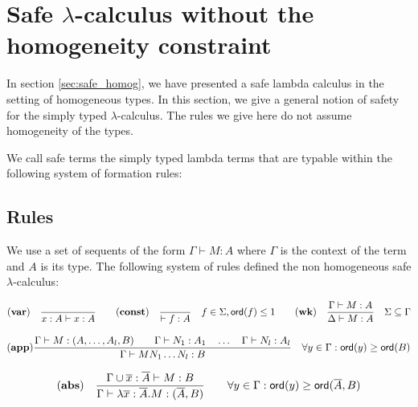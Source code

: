 \clearpage

\section{Safe $\lambda$-calculus without the homogeneity constraint}
\label{sec:safe_nonhomog}


In section \ref{sec:safe_homog}, we have presented a safe lambda
calculus in the setting of homogeneous types. In this section, we
give a general notion of safety for the simply typed
$\lambda$-calculus. The rules we give here do not assume homogeneity
of the types.

We call safe terms the simply typed lambda terms that are
typable within the following system of formation rules:

\subsection{Rules}

We use a set of sequents of the form $\Gamma \vdash M : A$ where $\Gamma$ is the context of the term and $A$ is its type.
The following system of rules defined the non homogeneous safe $\lambda$-calculus:

$$ \mathbf{(var)} \quad  \frac{\displaystyle }{x : A\vdash x : A}
\qquad  \mathbf{(const)} \quad  \frac{\displaystyle }{\vdash f : A} \quad f \in \Sigma, {\sf ord}(f) \leq 1
\qquad  \mathbf{(wk)} \quad  \frac{\displaystyle \Gamma \vdash M : A}{\Delta \vdash M : A} \quad \Sigma \subseteq \Gamma$$

$$ \mathbf{(app)} \frac{\displaystyle \Gamma \vdash M : (A,\ldots,A_l,B)
                                        \qquad \Gamma \vdash N_1 : A_1
                                        \quad \ldots \quad \Gamma \vdash N_l : A_l  }{\Gamma  \vdash M N_1 \ldots N_l : B}
                                    \quad
                                   \forall y \in \Gamma : {\sf ord}(y) \geq {\sf ord}(B)$$

$$ \mathbf{(abs)} \quad  \frac{\displaystyle \Gamma \cup \overline{x} : \overline{A} \vdash M : B}{\Gamma  \vdash \lambda \overline{x} : \overline{A} . M : (\overline{A},B)} \qquad
                                   \forall y \in \Gamma : {\sf ord}(y) \geq {\sf ord}(\overline{A},B)$$


